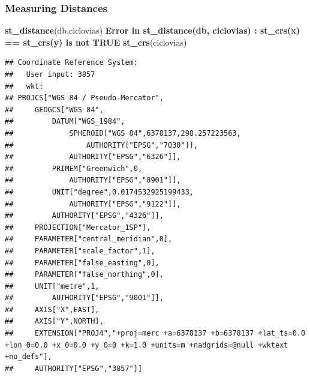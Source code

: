\documentclass[
  shownotes,
  xcolor={svgnames},
  hyperref={colorlinks,citecolor=DarkBlue,linkcolor=DarkRed,urlcolor=DarkBlue}
   , aspectratio=169]{beamer}
\newenvironment{Shaded}{\begin{snugshade}}{\end{snugshade}}
\newcommand{\ErrorTok}[1]{\textcolor[rgb]{0.64,0.00,0.00}{\textbf{#1}}}
\newcommand{\KeywordTok}[1]{\textcolor[rgb]{0.13,0.29,0.53}{\textbf{#1}}}
\newcommand{\NormalTok}[1]{#1}
\begin{document}
\begin{frame}[fragile]
\frametitle{Measuring Distances}

\begin{scriptsize}
\begin{Shaded}
\begin{Highlighting}[]
\KeywordTok{st\_distance}\NormalTok{(db,ciclovias)}
\ErrorTok{Error in st_distance(db, ciclovias) : st_crs(x) == st_crs(y) is not TRUE}
\KeywordTok{st\_crs}\NormalTok{(ciclovias)}
\end{Highlighting}
\end{Shaded}
\end{scriptsize}
\begin{tiny}
\begin{verbatim}
## Coordinate Reference System:
##   User input: 3857 
##   wkt:
## PROJCS["WGS 84 / Pseudo-Mercator",
##     GEOGCS["WGS 84",
##         DATUM["WGS_1984",
##             SPHEROID["WGS 84",6378137,298.257223563,
##                 AUTHORITY["EPSG","7030"]],
##             AUTHORITY["EPSG","6326"]],
##         PRIMEM["Greenwich",0,
##             AUTHORITY["EPSG","8901"]],
##         UNIT["degree",0.0174532925199433,
##             AUTHORITY["EPSG","9122"]],
##         AUTHORITY["EPSG","4326"]],
##     PROJECTION["Mercator_1SP"],
##     PARAMETER["central_meridian",0],
##     PARAMETER["scale_factor",1],
##     PARAMETER["false_easting",0],
##     PARAMETER["false_northing",0],
##     UNIT["metre",1,
##         AUTHORITY["EPSG","9001"]],
##     AXIS["X",EAST],
##     AXIS["Y",NORTH],
##     EXTENSION["PROJ4","+proj=merc +a=6378137 +b=6378137 +lat_ts=0.0 +lon_0=0.0 +x_0=0.0 +y_0=0 +k=1.0 +units=m +nadgrids=@null +wktext +no_defs"],
##     AUTHORITY["EPSG","3857"]]
\end{verbatim}
\end{tiny}
\end{frame}
\end{document}
